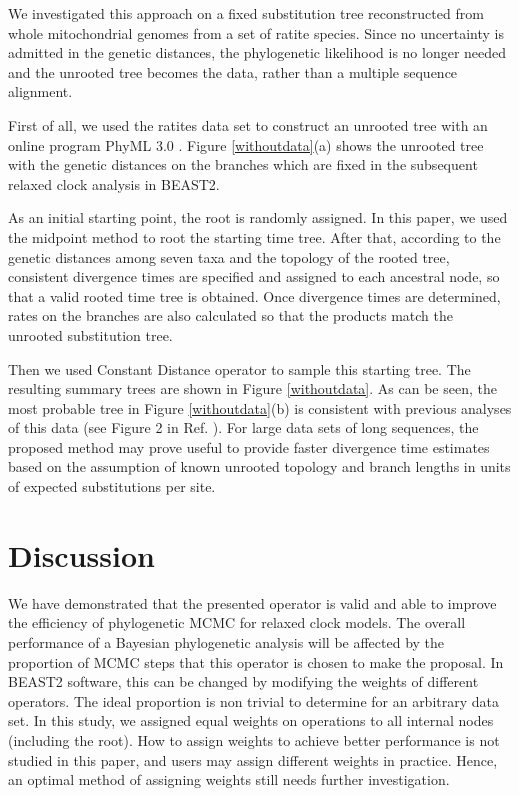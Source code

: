 \documentclass{bmcart}
\begin{document}
We investigated this approach on a fixed substitution tree reconstructed from whole mitochondrial genomes from a set of ratite species. Since no uncertainty is admitted in the genetic distances, the phylogenetic likelihood is no longer needed and the unrooted tree becomes the data, rather than a multiple sequence alignment.

First of all, we used the ratites data set to construct an unrooted tree with an online program PhyML 3.0 \cite{phyml,guindon2010new}.  Figure \ref{withoutdata}(a) shows the unrooted tree with the genetic distances on the branches which are fixed in the subsequent relaxed clock analysis in BEAST2.

As an initial starting point, the root is randomly assigned. In this paper, we used the midpoint method to root the starting time tree. After that, according to the genetic distances among seven taxa and the topology of the rooted tree, consistent divergence times are specified and assigned to each ancestral node, so that a valid rooted time tree is obtained. Once divergence times are determined, rates on the branches are also calculated so that the products match the unrooted substitution tree.

Then we used Constant Distance operator to sample this starting tree. The resulting summary trees are shown in Figure \ref{withoutdata}. As can be seen, the most probable tree in Figure \ref{withoutdata}(b) is consistent with previous analyses of this data (see Figure 2 in Ref. \cite{cooper2001complete}). For large data sets of long sequences, the proposed method may prove useful to provide faster divergence time estimates based on the assumption of known unrooted topology and branch lengths in units of expected substitutions per site.

\section*{Discussion}
We have demonstrated that the presented operator is valid and able to improve the efficiency of phylogenetic MCMC for relaxed clock models. The overall performance of a Bayesian phylogenetic analysis will be affected by the proportion of MCMC steps that this operator is chosen to make the proposal. In BEAST2 software, this can be changed by modifying the weights of different operators. The ideal proportion is non trivial to determine for an arbitrary data set. In this study, we assigned equal weights on operations to all internal nodes (including the root). How to assign weights to achieve better performance is not studied in this paper, and users may assign different weights in practice. Hence, an optimal method of assigning weights still needs further investigation. 
\end{document}

